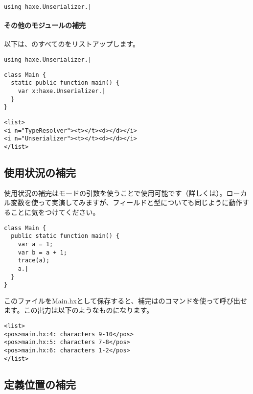 \begin{lstlisting}
using haxe.Unserializer.|
\end{lstlisting}


\paragraph{その他のモジュールの補完}

以下は、のすべてのをリストアップします。

\begin{lstlisting}
using haxe.Unserializer.|
\end{lstlisting}

\begin{lstlisting}
class Main {
  static public function main() {
    var x:haxe.Unserializer.|
  }
}
\end{lstlisting}

\begin{lstlisting}
<list>
<i n="TypeResolver"><t></t><d></d></i>
<i n="Unserializer"><t></t><d></d></i>
</list>
\end{lstlisting}


\subsection{使用状況の補完}
\label{cr-completion-usage}

使用状況の補完はモードの引数を使うことで使用可能です（詳しくは）。ローカル変数を使って実演してみますが、フィールドと型についても同じように動作することに気をつけてください。

\begin{lstlisting}
class Main {
  public static function main() {
    var a = 1;
    var b = a + 1;
    trace(a);
    a.|
  }
}
\end{lstlisting}

このファイルをMain.hxとして保存すると、補完はのコマンドを使って呼び出せます。この出力は以下のようなものになります。

\begin{lstlisting}
<list>
<pos>main.hx:4: characters 9-10</pos>
<pos>main.hx:5: characters 7-8</pos>
<pos>main.hx:6: characters 1-2</pos>
</list>
\end{lstlisting}


\subsection{定義位置の補完}
\label{cr-completion-position}

